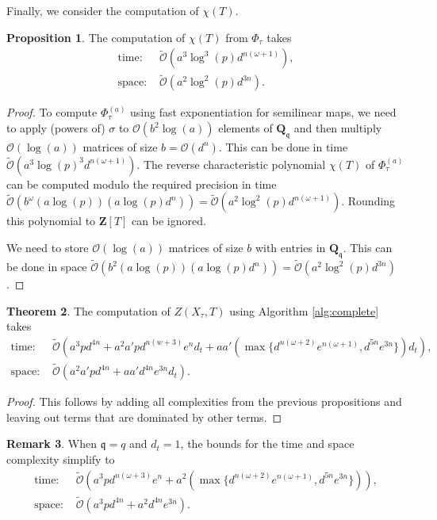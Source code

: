 \documentclass[a4paper,11pt]{article}
\numberwithin{equation}{section}
\newcommand{\ZZ}{\mathbf{Z}} %
\newcommand{\QQ}{\mathbf{Q}} %
\theoremstyle{definition}
\newtheorem{thm}{Theorem}[section]
\newtheorem{prop}[thm]{Proposition}
\newtheorem{rem}[thm]{Remark}
\begin{document}
Finally, we consider the computation of $\chi(T)$.

\begin{prop}
The computation of $\chi(T)$ from $\Phi_{\tau}$ takes
\begin{align*}
\mbox{time: }  &\tilde{\mathcal{O}}(a^3 \log^3(p) d^{n(\omega+1)}), \\
\mbox{space: } &\tilde{\mathcal{O}}(a^2 \log^2(p) d^{3n}).
\end{align*}
\end{prop}

\begin{proof}
To compute $\Phi_{\tau}^{(a)}$ using fast exponentiation for semilinear maps, we need to apply (powers of) $\sigma$ to $\mathcal{O}(b^2 \log(a))$
elements of $\QQ_{\mathfrak{q}}$ and then multiply $\mathcal{O}(\log(a))$ matrices of size $b=\mathcal{O}(d^n)$. This
can be done in time $\tilde{\mathcal{O}}(a^3 \log(p)^3 d^{n(\omega+1)})$. The reverse characteristic polynomial $\chi(T)$ of 
$\Phi_{\tau}^{(a)}$ can be computed modulo the required precision in time 
$\tilde{\mathcal{O}}(b^{\omega} (a \log(p))(a \log(p) d^n))= \tilde{\mathcal{O}}(a^2 \log^2(p) d^{n(\omega+1)})$. Rounding
this polynomial to $\ZZ[T]$ can be ignored.

We need to store $\mathcal{O}(\log(a))$ matrices of size $b$ with entries in $\QQ_{\mathfrak{q}}$. This can be done in
space $\tilde{\mathcal{O}}(b^2 (a \log(p))(a \log(p) d^n))= \tilde{\mathcal{O}}(a^2 \log^2(p) d^{3n})$.
\end{proof}

\begin{thm}
The computation of $Z(X_{\tau},T)$ using Algorithm \ref{alg:complete} takes
\begin{align*}
\mbox{time: }  &\tilde{\mathcal{O}}(a^3 p d^{4n} + a^2 a' p d^{n(w+3)} e^n d_t+ a a' (\max \{ d^{n(\omega+2)} e^{n(\omega+1)}, d^{5n}e^{3n} \}) d_t), \\
\mbox{space: } &\tilde{\mathcal{O}}(a^2 a' p d^{4n}+a a' d^{4n} e^{3n} d_t).
\end{align*}
\end{thm}

\begin{proof}
This follows by adding all complexities from the previous propositions and leaving out terms that are dominated by other terms.
\end{proof}

\begin{rem}
When $\mathfrak{q}=q$ and $d_t=1$, the bounds for the time and space complexity simplify to
\begin{align*}
\mbox{time: }  &\tilde{\mathcal{O}}(a^3 p d^{n( \omega+3 )} e^n + a^2 ( \max \{ d^{n( \omega+2 )} e^{n(\omega+1 )}, d^{5n}e^{3n} \} )), \\
\mbox{space: } &\tilde{\mathcal{O}}(a^3 p d^{4n}+a^2 d^{4n} e^{3n}).
\end{align*}
\end{rem}
\end{document}
